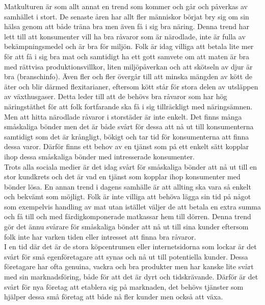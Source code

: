 \documentclass[10pt,a4paper,oneside]{article}
\begin{document}
Matkulturen är som allt annat en trend som kommer och går och påverkas av samhället i stort. De senaste åren har allt fler människor börjat bry sig om sin hälsa genom att både träna bra men även få i sig bra näring. Denna trend har lett till att konsumenter vill ha bra råvaror som är närodlade, inte är fulla av bekämpningsmedel och är bra för miljön. Folk är idag villiga att betala lite mer för att få i sig bra mat och samtidigt ha ett gott samvete om att maten är bra med rättvisa produktionsvillkor, liten miljöpåverkan och att skötseln av djur är bra (branschinfo). Även fler och fler övergår till att minska mängden av kött de äter och blir därmed flexitarianer, eftersom kött står för stora delen av utsläppen av växthusgaser. Detta leder till att de behövs bra råvaror som har hög näringstäthet för att folk fortfarande ska få i sig tillräckligt med näringsämnen. Men att hitta närodlade råvaror i storstäder är inte enkelt. Det finns många småskaliga bönder men det är både svårt för dessa att nå ut till konsumenterna samtidigt som det är krångligt, bökigt och tar tid för konsumenterna att finna dessa varor. Därför finns ett behov av en tjänst som på ett enkelt sätt kopplar ihop dessa småskaliga bönder med intresserade konsumenter.\\
 
Trots alla sociala medier är det idag svårt för småskaliga bönder att nå ut till en stor kundkrets och det är vad en tjänst som kopplar ihop konsumenter med bönder lösa. En annan trend i dagens samhälle är att allting ska vara så enkelt och bekvämt som möjligt. Folk är inte villiga att behöva lägga sin tid på något som exempelvis handling av mat utan istället väljer de att betala en extra summa och få till och med färdigkomponerade matkassar hem till dörren. Denna trend gör det ännu svårare för småskaliga bönder att nå ut till sina kunder eftersom folk inte har varken tiden eller intresset att finna bra råvaror.\\

I en tid där det är de stora köpcentrumen eller internetsidorna som lockar är det svårt för små egenföretagare att synas och nå ut till potentiella kunder. Dessa företagare har ofta genuina, vackra och bra produkter men har kanske lite svårt med sin marknadsföring, både för att det är dyrt och tidskrävande. Därför är det svårt för nya företag att etablera sig på marknaden, det behövs tjänster som hjälper dessa små företag att både nå fler kunder men också att växa.\\
 
\end{document}
